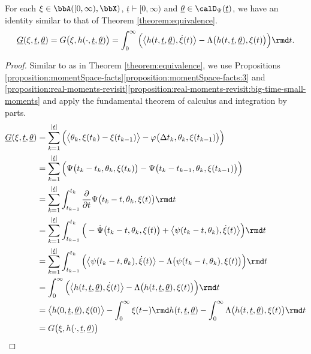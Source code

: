 \begin{lemma}
  \label{lemma:fdd-rf-as-integral}
  For each $\pathVar \in \acpathSpace{[0,\infty)}{\stateSpace}$, $\underline t \vdash [0,\infty)$ and $\underline\twistVar \in \momentSpace(\underline t)$, we have an identity similar to that of Theorem \ref{theorem:equivalence}.
  \begin{equation*}
    \fddRf(\pathVar, \underline t, \underline\twistVar) = \mgRf\big(\pathVar, \twistFunc(\cdot, \underline t, \underline\twistVar)\big) = \int_0^\infty \Big( \bprj{\twistFunc(t, \underline t, \underline\twistVar)}{\dot\pathVar(t)} - \ode\big(\twistFunc(t, \underline t, \underline\twistVar), \pathVar(t)\big) \Big) \rmd t.
  \end{equation*}
\end{lemma}

\begin{proof}
  Similar to as in Theorem \ref{theorem:equivalence}, we use Propositions \ref{proposition:momentSpace-facts}\ref{proposition:momentSpace-facts:3} and \ref{proposition:real-moments-revisit}\ref{proposition:real-moments-revisit:big-time-small-moments} and apply the fundamental theorem of calculus and integration by parts.
  \begin{align*}
    \fddRf(\pathVar, \underline t, \underline\twistVar)
    &= \sum_{k=1}^{|\underline t|} \Big( \bprj{\twistVar_k}{\pathVar(t_k)-\pathVar(t_{k-1})} - \affShift\big(\Delta t_k, \twistVar_k, \pathVar(t_{k-1})\big) \Big) \\
    &= \sum_{k=1}^{|\underline t|} \Big( \aff\big(t_k-t_k, \twistVar_k, \pathVar(t_k) \big) - \aff\big(t_k-t_{k-1}, \twistVar_k, \pathVar(t_{k-1})\big) \Big) \\
    &= \sum_{k=1}^{|\underline t|} \int_{t_{k-1}}^{t_k} \frac{\partial}{\partial t} \aff\big(t_k-t, \twistVar_k, \pathVar(t)\big) \rmd t \\
    &= \sum_{k=1}^{|\underline t|} \int_{t_{k-1}}^{t_k} \Big( -\dot\aff\big(t_k-t, \twistVar_k, \pathVar(t)\big) + \bprj{\affPart(t_k-t, \twistVar_k)}{\dot\pathVar(t)} \Big) \rmd t \\
    &= \sum_{k=1}^{|\underline t|} \int_{t_{k-1}}^{t_k} \Big( \bprj{\affPart(t_k-t, \twistVar_k)}{\dot\pathVar(t)} - \ode\big( \affPart(t_k-t,\twistVar_k), \pathVar(t) \big)\Big) \rmd t \\
    &= \int_0^\infty \Big( \bprj{\twistFunc(t,\underline t,\underline\twistVar)}{\dot\pathVar(t)} - \ode\big(\twistFunc(t, \underline t, \underline\twistVar), \pathVar(t)\big) \Big) \rmd t \\
    &= \bprj{\twistFunc(0, \underline t, \underline\twistVar)}{\pathVar(0)} - \int_0^\infty \pathVar(t-) \rmd\twistFunc(t,\underline t,\underline\twistVar)- \int_0^\infty \ode\big(\twistFunc(t, \underline t, \underline\twistVar), \pathVar(t)\big) \rmd t \\
    &= \mgRf\big(\pathVar, \twistFunc(\cdot, \underline t, \underline\twistVar) \big)
  \end{align*}
\end{proof}

